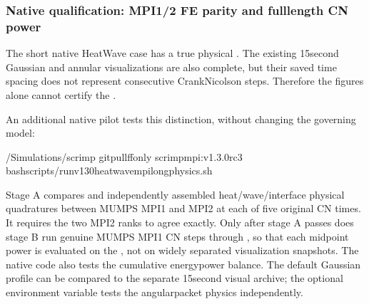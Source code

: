 \documentclass[letterpaper,10pt,english]{sphinxmanual}
\begin{document}
\subsubsection{Native qualification: MPI1/2 FE parity and full\sphinxhyphen{}length CN power}
\label{\detokenize{examples/heat_wave:native-qualification-mpi1-2-fe-parity-and-full-length-cn-power}}
\sphinxAtStartPar
The short native Heat\textendash{}Wave case has a
true physical .
The existing 15\sphinxhyphen{}second Gaussian and
annular visualizations are also complete,
but their saved  time spacing
does not represent consecutive 
Crank\textendash{}Nicolson steps. Therefore the
figures alone cannot certify the
.

\sphinxAtStartPar
An additional  native pilot
tests this distinction, without changing
the governing model:

\begin{sphinxVerbatim}[commandchars=\\\{\}]
\PYGZti{}/Simulations/scrimp
gitpull\PYGZhy{}\PYGZhy{}ff\PYGZhy{}only
scrimp\PYGZhy{}mpi:v1.3.0\PYGZhy{}rc3
bashscripts/run\PYGZhy{}v130\PYGZhy{}heat\PYGZhy{}wave\PYGZhy{}mpi\PYGZhy{}long\PYGZhy{}physics.sh
\end{sphinxVerbatim}

\sphinxAtStartPar
Stage A compares  and independently assembled
heat/wave/interface physical quadratures
between MUMPS MPI1 and MPI2 at each of
five original CN times. It requires
the two MPI2 ranks to agree exactly.
Only after stage A passes does stage B
run  genuine MUMPS MPI1 CN
steps through ,
 so that
each midpoint power is evaluated on the
, not on
widely separated visualization snapshots.
The native code also tests the cumulative
energy\sphinxhyphen{}power balance. The default
Gaussian profile can be compared to
the separate 15\sphinxhyphen{}second visual archive;
the optional environment variable
tests the angular\sphinxhyphen{}packet physics
independently.
\end{document}
